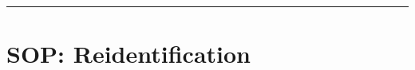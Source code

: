 \par\noindent\rule{\textwidth\color{pniblue}}{0.4pt}
\section{SOP: Reidentification}
\label{section:sop_reidentification}